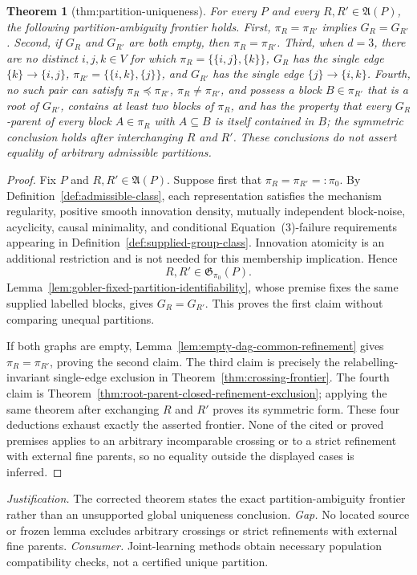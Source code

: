 \documentclass{article}
\newtheorem{theorem}{Theorem}
\begin{document}
\begin{theorem}[thm:partition-uniqueness]\label{thm:partition-uniqueness}
For every \(P\) and every \(R,R'\in\mathfrak A(P)\), the following partition-ambiguity frontier holds. First, \(\pi_R=\pi_{R'}\) implies \(G_R=G_{R'}\). Second, if \(G_R\) and \(G_{R'}\) are both empty, then \(\pi_R=\pi_{R'}\). Third, when \(d=3\), there are no distinct \(i,j,k\in V\) for which \(\pi_R=\{\{i,j\},\{k\}\}\), \(G_R\) has the single edge \(\{k\}\to\{i,j\}\), \(\pi_{R'}=\{\{i,k\},\{j\}\}\), and \(G_{R'}\) has the single edge \(\{j\}\to\{i,k\}\). Fourth, no such pair can satisfy \(\pi_R\preceq\pi_{R'}\), \(\pi_R\neq\pi_{R'}\), and possess a block \(B\in\pi_{R'}\) that is a root of \(G_{R'}\), contains at least two blocks of \(\pi_R\), and has the property that every \(G_R\)-parent of every block \(A\in\pi_R\) with \(A\subseteq B\) is itself contained in \(B\); the symmetric conclusion holds after interchanging \(R\) and \(R'\). These conclusions do not assert equality of arbitrary admissible partitions.
\end{theorem}
\begin{proof}
Fix \(P\) and \(R,R'\in\mathfrak A(P)\).  Suppose first that
\(\pi_R=\pi_{R'}=: \pi_0\).  By
Definition~\ref{def:admissible-class}, each representation satisfies the
mechanism regularity, positive smooth innovation density, mutually independent
block-noise, acyclicity, causal minimality, and conditional Equation~(3)-failure
requirements appearing in Definition~\ref{def:supplied-group-class}.
Innovation atomicity is an additional restriction and is not needed for this
membership implication.  Hence
\[
 R,R'\in\mathfrak G_{\pi_0}(P).
\]
Lemma~\ref{lem:gobler-fixed-partition-identifiability}, whose premise fixes the
same supplied labelled blocks, gives \(G_R=G_{R'}\).  This proves the first
claim without comparing unequal partitions.

If both graphs are empty, Lemma~\ref{lem:empty-dag-common-refinement} gives
\(\pi_R=\pi_{R'}\), proving the second claim.  The third claim is precisely the
relabelling-invariant single-edge exclusion in
Theorem~\ref{thm:crossing-frontier}.  The fourth claim is
Theorem~\ref{thm:root-parent-closed-refinement-exclusion}; applying the same
theorem after exchanging \(R\) and \(R'\) proves its symmetric form.  These
four deductions exhaust exactly the asserted frontier.  None of the cited or
proved premises applies to an arbitrary incomparable crossing or to a strict
refinement with external fine parents, so no equality outside the displayed
cases is inferred.
\end{proof}
\par\smallskip\noindent \textit{Justification.} The corrected theorem states the exact partition-ambiguity frontier rather than an unsupported global uniqueness conclusion. \textit{Gap.} No located source or frozen lemma excludes arbitrary crossings or strict refinements with external fine parents. \textit{Consumer.} Joint-learning methods obtain necessary population compatibility checks, not a certified unique partition.
\end{document}
